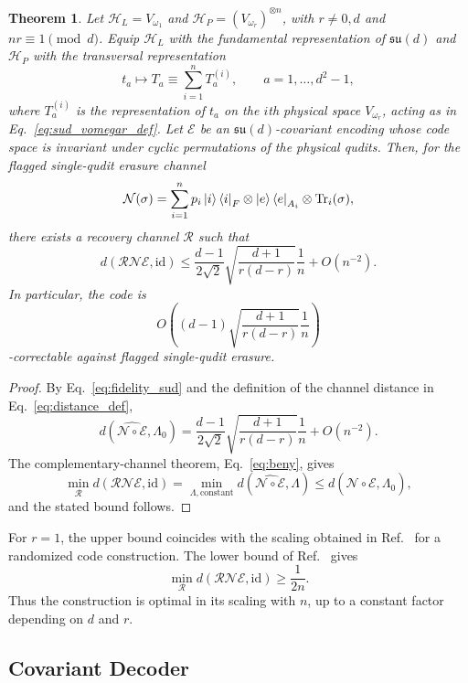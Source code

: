 \documentclass[10pt,twocolumn,superscriptaddress,aps,amsmath,amssymb,citeautoscript,floatfix,prx,longbibliography]{revtex4-2}
\newtheorem{theorem}{Theorem}
\theoremstyle{plain}
\theoremstyle{plain}
\theoremstyle{plain}
\theoremstyle{plain}
\theoremstyle{plain}
\theoremstyle{plain}
\begin{document}
\begin{theorem}\label{thrm:sudscale}
Let $\mathcal H_L=V_{\omega_1}$ and $\mathcal H_P=(V_{\omega_r})^{\otimes n}$, with $r\neq 0,d$ and $nr\equiv 1\pmod d$. Equip $\mathcal H_L$ with the fundamental representation of $\mathfrak{su}(d)$ and $\mathcal H_P$ with the transversal representation
\begin{equation}
t_a
\longmapsto
T_a
\equiv
\sum_{i=1}^n T_a^{(i)},
\qquad
a=1,\ldots,d^2-1,
\end{equation}
where $T_a^{(i)}$ is the representation of $t_a$ on the $i$th physical space $V_{\omega_r}$, acting as in Eq.~\eqref{eq:sud_vomegar_def}. Let $\mathcal E$ be an $\mathfrak{su}(d)$-covariant encoding whose code space is invariant under cyclic permutations of the physical qudits. Then, for the flagged single-qudit erasure channel
$$
\mathcal N(\sigma)
=
\sum_{i=1}^n
p_i\ket i\bra i_F
\otimes
\ket e\bra e_{A_i}
\otimes
\operatorname{Tr}_i(\sigma),
$$
there exists a recovery channel $\mathcal R$ such that
$$
d(\mathcal R\mathcal N\mathcal E,\mathrm{id})
\le
\frac{d-1}{2\sqrt 2}
\sqrt{\frac{d+1}{r(d-r)}}
\frac1n
+
O(n^{-2}) .
$$
In particular, the code is
$$
O\left(
(d-1)
\sqrt{\frac{d+1}{r(d-r)}}
\frac1n
\right)
$$
-correctable against flagged single-qudit erasure.
\end{theorem}

\begin{proof}
By Eq.~\eqref{eq:fidelity_sud} and the definition of the channel distance in Eq.~\eqref{eq:distance_def},
$$
d\left(\widehat{\mathcal N\circ\mathcal E},\Lambda_0\right)
=
\frac{d-1}{2\sqrt 2}
\sqrt{\frac{d+1}{r(d-r)}}
\frac1n
+
O(n^{-2}) .
$$
The complementary-channel theorem, Eq.~\eqref{eq:beny}, gives
$$
\min_{\mathcal R}
d(\mathcal R\mathcal N\mathcal E,\mathrm{id})
=
\min_{\Lambda,\mathrm{constant}}
d\left(\widehat{\mathcal N\circ\mathcal E},\Lambda\right)
\le
d\left(\widehat{\mathcal N\circ\mathcal E},\Lambda_0\right),
$$
and the stated bound follows.
\end{proof}

For $r=1$, the upper bound coincides with the scaling obtained in Ref.~\cite{Kong2022} for a randomized code construction. The lower bound of Ref.~\cite{Faist2020} gives
$$
\min_{\mathcal R}
d(\mathcal R\mathcal N\mathcal E,\mathrm{id})
\ge
\frac{1}{2n}.
$$
Thus the construction is optimal in its scaling with $n$, up to a constant factor depending on $d$ and $r$.

\subsection{Covariant Decoder}\label{subsec:main_decoder}
\end{document}
